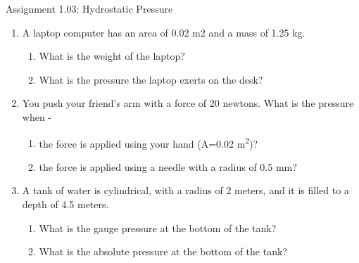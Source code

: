 \documentclass[letterpaper, 11pt]{article}
\begin{document}
	

	
\begin{center}Assignment 1.03: Hydrostatic Pressure
\end{center}

\begin{enumerate}
	\item A laptop computer has an area of 0.02 m2 and a mass of 1.25 kg. 
	\begin{enumerate}
		\item What is the weight of the laptop?
		\vspace{0.5in}
		\item What is the pressure the laptop exerts on the desk?
		\vspace{0.5in}
	\end{enumerate}
	


	\item You push your friend's arm with a force of 20 newtons.  What is the pressure when - 
		\begin{enumerate}
			\item the force is applied using your hand (A=0.02 m\textsuperscript{2})?
				\vspace{0.5in}
		
			\item the force is applied using a needle with a radius of 0.5 mm?
			\vspace{0.5in}
		\end{enumerate}


	\item A tank of water is cylindrical, with a radius of 2 meters, and it is filled to a depth of 4.5 meters.
		\begin{enumerate}
			\item What is the gauge pressure at the bottom of the tank?
			\vspace{0.5in}
			
			
			
			
			\item What is the absolute pressure at the bottom of the tank?
			\vspace{0.5in}
			
			
			
			
		\end{enumerate}
 

\end{enumerate}
\end{document}

